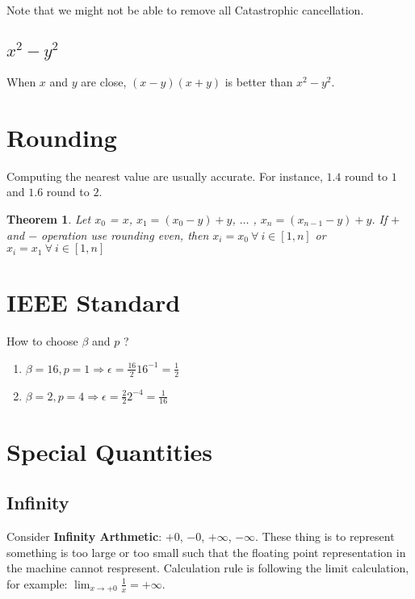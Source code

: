 \documentclass{article}
\newtheorem{theorem}{Theorem}
\begin{document}
        Note that we might not be able to remove all Catastrophic cancellation.

        \subsection{$x^2 - y^2$}

        When $x$ and $y$ are close, $(x-y)(x+y)$ is better than $x^2 - y^2$.
        
        \section{Rounding}

        Computing the nearest value are usually accurate.
        For instance, $1.4$ round to $1$ and  $1.6$ round to $2$.

        \begin{theorem}
            Let $x_0$ = $x$, $x_1 = (x_0-y)+y$, $\dots$ , $x_n = (x_{n-1}-y)+y$.
            If $+$ and $-$ operation use rounding even, then
            $x_i = x_0 \ \forall \ i \in [1, n]$ or 
            $x_i = x_1 \ \forall \ i \in [1, n]$
        \end{theorem}

        \section{IEEE Standard}

        How to choose $\beta$ and $p$ ?

        \begin{enumerate}
            \item $\beta = 16, p = 1 \Rightarrow \epsilon = \frac{16}{2}16^{-1} = \frac{1}{2}$ 
            \item $\beta = 2, p = 4 \Rightarrow \epsilon = \frac{2}{2}2^{-4} = \frac{1}{16}$ 
        \end{enumerate}

        \section{Special Quantities}

        \subsection{Infinity}

        Consider \textbf{Infinity Arthmetic}: $+0$, $-0$, $+\infty$, $-\infty$.
        These thing is to represent something is too large or too small such that
        the floating point representation in the machine cannot respresent.
        Calculation rule is following the limit calculation, for example:
        $\lim_{x \rightarrow +0} \frac{1}{x} = +\infty$.
        
\end{document}
